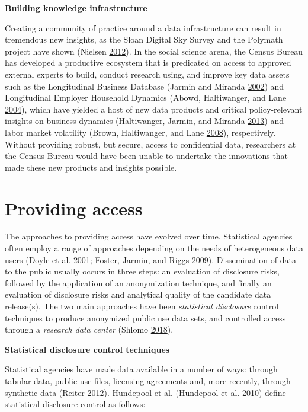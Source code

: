 \documentclass[]{krantz}
\begin{document}
\textbf{Building knowledge infrastructure}

Creating a community of practice around a data infrastructure can result
in tremendous new insights, as the Sloan Digital Sky Survey and the
Polymath project have shown (Nielsen
\protect\hyperlink{ref-nielsen2012reinventing}{2012}). In the social
science arena, the Census Bureau has developed a productive ecosystem
that is predicated on access to approved external experts to build,
conduct research using, and improve key data assets such as the
Longitudinal Business Database (Jarmin and Miranda
\protect\hyperlink{ref-jarmin2002longitudinal}{2002}) and Longitudinal
Employer Household Dynamics (Abowd, Haltiwanger, and Lane
\protect\hyperlink{ref-abowd2004integrated}{2004}), which have yielded a
host of new data products and critical policy-relevant insights on
business dynamics (Haltiwanger, Jarmin, and Miranda
\protect\hyperlink{ref-haltiwanger2013creates}{2013}) and labor market
volatility (Brown, Haltiwanger, and Lane
\protect\hyperlink{ref-brown2008economic}{2008}), respectively. Without
providing robust, but secure, access to confidential data, researchers
at the Census Bureau would have been unable to undertake the innovations
that made these new products and insights possible.

\section{Providing access}\label{providing-access}

The approaches to providing access have evolved over time. Statistical
agencies often employ a range of approaches depending on the needs of
heterogeneous data users (Doyle et al.
\protect\hyperlink{ref-doyle2001confidentiality}{2001}; Foster, Jarmin,
and Riggs \protect\hyperlink{ref-foster2009resolving}{2009}).
Dissemination of data to the public usually occurs in three steps: an
evaluation of disclosure risks, followed by the application of an
anonymization technique, and finally an evaluation of disclosure risks
and analytical quality of the candidate data release(s). The two main
approaches have been \emph{statistical disclosure} control techniques to
produce anonymized public use data sets, and controlled access through a
\emph{research data center} (Shlomo
\protect\hyperlink{ref-shlomo2018}{2018}).

\textbf{Statistical disclosure control techniques}

Statistical agencies have made data available in a number of ways:
through tabular data, public use files, licensing agreements and, more
recently, through synthetic data (Reiter
\protect\hyperlink{ref-reiter2012statistical}{2012}). Hundepool et al.
(Hundepool et al. \protect\hyperlink{ref-hundepool2010handbook}{2010})
define statistical disclosure control as follows:
\end{document}
